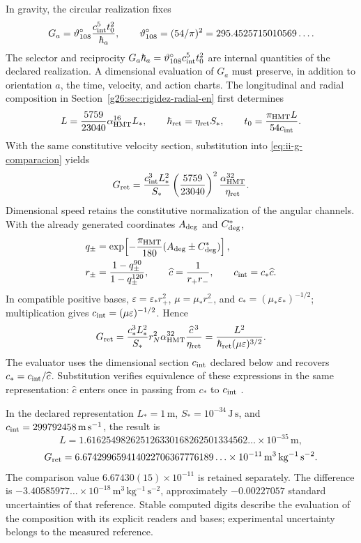 In gravity, the circular realization fixes
\begin{equation}
 G_a=\vartheta_{108}^{\circ}\frac{c_{\rm int}^{5}t_0^2}{\hbar_a},
 \qquad
 \vartheta_{108}^{\circ}=(54/\pi)^2
 =295.4525715010569\ldots.
 \label{eq:ii-g-comparacion}
\end{equation}
The selector and reciprocity \(G_a\hbar_a=
\vartheta_{108}^{\circ}c_{\rm int}^{5}t_0^2\) are internal quantities of
the declared realization. A dimensional evaluation of \(G_a\) must
preserve, in addition to orientation \(a\), the time,
velocity, and action charts. The longitudinal and radial composition in
Section~\ref{g26:sec:rigidez-radial-en} first determines
\[
 L=\frac{5759}{23040}\alpha_{\mathrm{HMT}}^{16}L_*,\qquad
 \hbar_{\rm ret}=\eta_{\rm ret}S_*,\qquad
 t_0=\frac{\pi_{\mathrm{HMT}}L}{54c_{\rm int}}.
\]
With the same constitutive velocity section, substitution into
\eqref{eq:ii-g-comparacion} yields
\[
 G_{\rm ret}=\frac{c_{\rm int}^3L_*^2}{S_*}
 \left(\frac{5759}{23040}\right)^2
 \frac{\alpha_{\mathrm{HMT}}^{32}}{\eta_{\rm ret}}.
\]
Dimensional speed retains the constitutive normalization of the angular
channels. With the already generated coordinates \(A_{\rm deg}\)
and \(C^*_{\rm deg}\),
\begin{equation}
 \begin{aligned}
 q_\pm&=\exp\!\left[-\frac{\pi_{\mathrm{HMT}}}{180}
               (A_{\rm deg}\pm C^*_{\rm deg})\right],\\
 r_\pm&=\frac{1-q_\pm^{90}}{1-q_\pm^{120}},\qquad
 \widehat c=\frac1{r_+r_-},\qquad c_{\rm int}=c_*\widehat c.
 \end{aligned}
 \label{eq:ii-g26-velocidad-constitutiva}
\end{equation}
In compatible positive bases,
\(\varepsilon=\varepsilon_*r_+^2\), \(\mu=\mu_*r_-^2\), and
\(c_*=(\mu_*\varepsilon_*)^{-1/2}\); multiplication gives
\(c_{\rm int}=(\mu\varepsilon)^{-1/2}\). Hence
\begin{equation}
 G_{\rm ret}=\frac{c_*^3L_*^2}{S_*}
 r_N^2\alpha_{\mathrm{HMT}}^{32}\frac{\widehat c^{\,3}}{\eta_{\rm ret}}
 =\frac{L^2}{\hbar_{\rm ret}(\mu\varepsilon)^{3/2}}.
 \label{eq:ii-g26-gravedad-constitutiva}
\end{equation}
The evaluator uses the dimensional section \(c_{\rm int}\) declared
below and recovers \(c_*=c_{\rm int}/\widehat c\). Substitution
verifies equivalence of these expressions in the same representation:
\(\widehat c\) enters once in passing from \(c_*\) to
\(c_{\rm int}\) \cite{hmtg26counter}.

In the declared representation \(L_*=1\,\mathrm m\),
\(S_*=10^{-34}\,\mathrm{J\,s}\), and
\(c_{\rm int}=299792458\,\mathrm{m\,s^{-1}}\), the result is
\[
 L=1.616254982625126330168262501334562\ldots\times10^{-35}
 \,\mathrm m,
\]
\[
 G_{\rm ret}=6.674299659414022706367776189\ldots\times10^{-11}
 \,\mathrm{m^3\,kg^{-1}\,s^{-2}}.
\]
The comparison value \(6.67430(15)\times10^{-11}\) is retained
separately. The difference is
\(-3.40585977\ldots\times10^{-18}\,\mathrm{m^3\,kg^{-1}\,s^{-2}}\),
approximately \(-0.00227057\) standard uncertainties of that reference.
Stable computed digits describe the evaluation of the composition with
its explicit readers and bases; experimental uncertainty belongs to the
measured reference.

